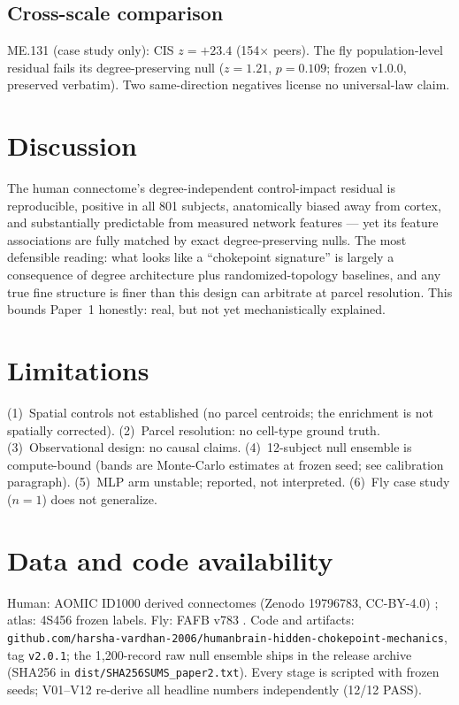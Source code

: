 \documentclass[11pt,a4paper]{article}
\begin{document}
\subsection{Cross-scale comparison}
ME.131 (case study only): CIS $z=+23.4$ (154$\times$ peers). The fly
population-level residual fails its degree-preserving null ($z=1.21$,
$p=0.109$; frozen v1.0.0, preserved verbatim). Two same-direction
negatives license no universal-law claim.

\section{Discussion}
The human connectome's degree-independent control-impact residual is
reproducible, positive in all 801 subjects, anatomically biased away from
cortex, and substantially predictable from measured network features ---
yet its feature associations are fully matched by exact degree-preserving
nulls. The most defensible reading: what looks like a ``chokepoint
signature'' is largely a consequence of degree architecture plus
randomized-topology baselines, and any true fine structure is finer than
this design can arbitrate at parcel resolution. This bounds Paper~1
honestly: real, but not yet mechanistically explained.

\section{Limitations}
(1)~Spatial controls not established (no parcel centroids; the enrichment
is not spatially corrected). (2)~Parcel resolution: no cell-type ground
truth. (3)~Observational design: no causal claims. (4)~12-subject null
ensemble is compute-bound (bands are Monte-Carlo estimates at frozen seed;
see calibration paragraph). (5)~MLP arm unstable; reported, not
interpreted. (6)~Fly case study ($n=1$) does not generalize.

\section{Data and code availability}\label{sec:avail}
Human: AOMIC ID1000 derived connectomes (Zenodo 19796783, CC-BY-4.0)
\cite{snoek2021}; atlas: 4S456 frozen labels. Fly: FAFB v783
\cite{dorkenwald2024}. Code and artifacts:
\texttt{github.com/harsha-vardhan-2006/humanbrain-hidden-chokepoint-mechanics},
tag \texttt{v2.0.1}; the 1{,}200-record raw null ensemble ships in the
release archive (SHA256 in \texttt{dist/SHA256SUMS\_paper2.txt}).
Every stage is scripted with frozen seeds; V01--V12 re-derive all headline
numbers independently (12/12 PASS).
\end{document}

